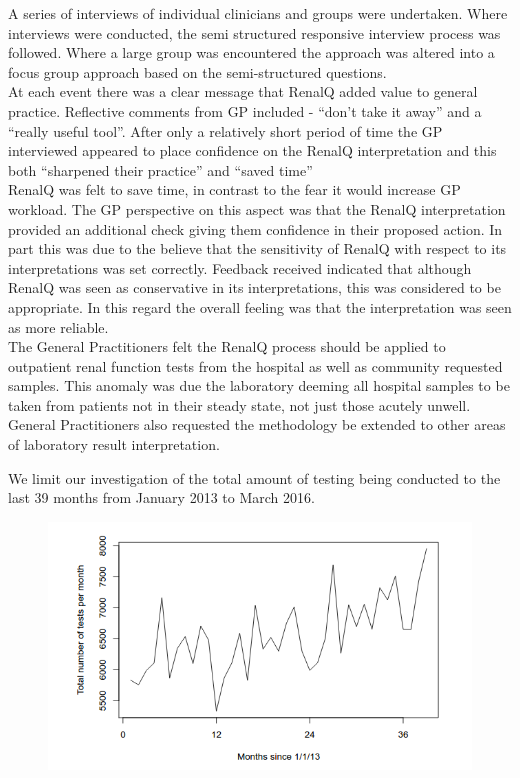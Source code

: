 \documentclass[11pt]{article}
\begin{document}
A series of interviews of individual clinicians and groups were undertaken. Where interviews were conducted, the semi structured responsive interview process was followed. Where a large group was encountered the approach was altered into a focus group approach based on the semi-structured questions.\\

At each event there was a clear message that RenalQ added value to general practice. Reflective comments from GP included - “don’t take it away” and a “really useful tool”. After only a relatively short period of time the GP interviewed appeared to place confidence on the RenalQ interpretation and this both “sharpened their practice” and “saved time”\\

RenalQ was felt to save time, in contrast to the fear it would increase GP workload. The GP perspective on this aspect was that the RenalQ interpretation provided an additional check giving them confidence in their proposed action. In part this was due to the believe that the sensitivity of RenalQ with respect to its interpretations was set correctly. Feedback received indicated that although RenalQ was seen as conservative in its interpretations, this was considered to be appropriate. In this regard the overall feeling was that the interpretation was seen as more reliable.\\

The General Practitioners felt the RenalQ process should be applied to outpatient renal function tests from the hospital as well as community requested samples. This anomaly was due the laboratory deeming all hospital samples to be taken from patients not in their steady state, not just those acutely unwell. General Practitioners also requested the methodology be extended to other areas of laboratory result interpretation.

We limit our investigation of the total amount of testing being conducted to the last 39 months from January 2013 to March 2016.\\

\begin{figure}[htp]
\centering
\includegraphics[scale=0.50]{Fig1.png}
\caption{}
\label{}
\end{figure}
\end{document}
